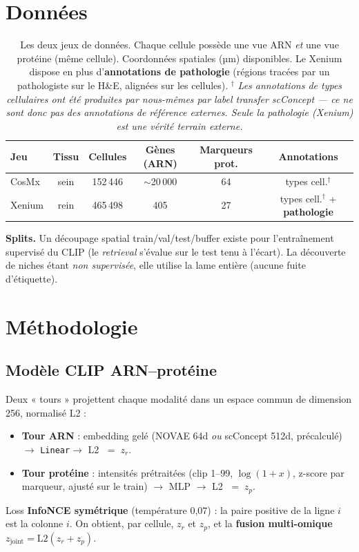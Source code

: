 \documentclass[11pt,a4paper]{article}
\begin{document}
\section{Données}
\begin{table}[h]
\centering
\small
\begin{tabular}{lccccc}
\toprule
Jeu & Tissu & Cellules & Gènes (ARN) & Marqueurs prot. & Annotations \\
\midrule
CosMx  & sein & 152\,446 & $\sim$20\,000 & 64 & types cell.$^\dagger$ \\
Xenium & rein & 465\,498 & 405 & 27 & types cell.$^\dagger$ + \textbf{pathologie} \\
\bottomrule
\end{tabular}
\caption{Les deux jeux de données. Chaque cellule possède une vue ARN \emph{et} une vue
protéine (même cellule). Coordonnées spatiales (µm) disponibles. Le Xenium dispose
en plus d'\textbf{annotations de pathologie} (régions tracées par un pathologiste sur le
H\&E, alignées sur les cellules).
$^\dagger$ \emph{Les annotations de types cellulaires ont été produites par nous-mêmes par
label transfer scConcept --- ce ne sont donc pas des annotations de référence externes.
Seule la pathologie (Xenium) est une vérité terrain externe.}}
\end{table}

\noindent
\textbf{Splits.} Un découpage spatial train/val/test/buffer existe pour l'entraînement
supervisé du CLIP (le \emph{retrieval} s'évalue sur le test tenu à l'écart). La découverte
de niches étant \emph{non supervisée}, elle utilise la lame entière (aucune fuite d'étiquette).

\section{Méthodologie}

\subsection{Modèle CLIP ARN--protéine}
Deux « tours » projettent chaque modalité dans un espace commun de dimension 256,
normalisé L2 :
\begin{itemize}[noitemsep]
  \item \textbf{Tour ARN} : embedding gelé (NOVAE 64d \emph{ou} scConcept 512d, précalculé)
        $\rightarrow$ \texttt{Linear}$\rightarrow$ L2 $\;=\; z_r$.
  \item \textbf{Tour protéine} : intensités prétraitées (clip 1--99, $\log(1+x)$, z-score par
        marqueur, ajusté sur le train) $\rightarrow$ MLP $\rightarrow$ L2 $\;=\; z_p$.
\end{itemize}
Loss \textbf{InfoNCE symétrique} (température 0{,}07) : la paire positive de la ligne $i$ est
la colonne $i$. On obtient, par cellule, $z_r$ et $z_p$, et la \textbf{fusion multi-omique}
$z_{\text{joint}} = \mathrm{L2}(z_r + z_p)$.
\end{document}
